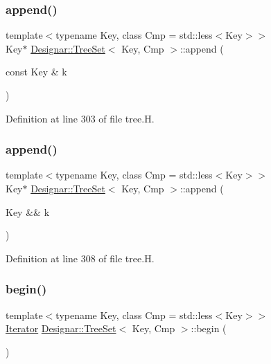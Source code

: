 \subsubsection{\texorpdfstring{append()}{append()}\hspace{0.1cm}{\footnotesize\ttfamily [1/2]}}
{\footnotesize\ttfamily template$<$typename Key, class Cmp = std\+::less$<$\+Key$>$$>$ \\
Key$\ast$ \hyperlink{class_designar_1_1_tree_set}{Designar\+::\+Tree\+Set}$<$ Key, Cmp $>$\+::append (\begin{DoxyParamCaption}\item[{const Key \&}]{k }\end{DoxyParamCaption})\hspace{0.3cm}{\ttfamily [inline]}}



Definition at line 303 of file tree.\+H.

\mbox{\label{class_designar_1_1_tree_set_a25bb5eea05f2ab11a2c988686fc3a42c}} 
\subsubsection{\texorpdfstring{append()}{append()}\hspace{0.1cm}{\footnotesize\ttfamily [2/2]}}
{\footnotesize\ttfamily template$<$typename Key, class Cmp = std\+::less$<$\+Key$>$$>$ \\
Key$\ast$ \hyperlink{class_designar_1_1_tree_set}{Designar\+::\+Tree\+Set}$<$ Key, Cmp $>$\+::append (\begin{DoxyParamCaption}\item[{Key \&\&}]{k }\end{DoxyParamCaption})\hspace{0.3cm}{\ttfamily [inline]}}



Definition at line 308 of file tree.\+H.

\mbox{\label{class_designar_1_1_tree_set_a2b51174c1290413611f407d54a3e5104}} 
\subsubsection{\texorpdfstring{begin()}{begin()}\hspace{0.1cm}{\footnotesize\ttfamily [1/2]}}
{\footnotesize\ttfamily template$<$typename Key, class Cmp = std\+::less$<$\+Key$>$$>$ \\
\hyperlink{class_designar_1_1_tree_set_1_1_iterator}{Iterator} \hyperlink{class_designar_1_1_tree_set}{Designar\+::\+Tree\+Set}$<$ Key, Cmp $>$\+::begin (\begin{DoxyParamCaption}{ }\end{DoxyParamCaption})\hspace{0.3cm}{\ttfamily [inline]}}



